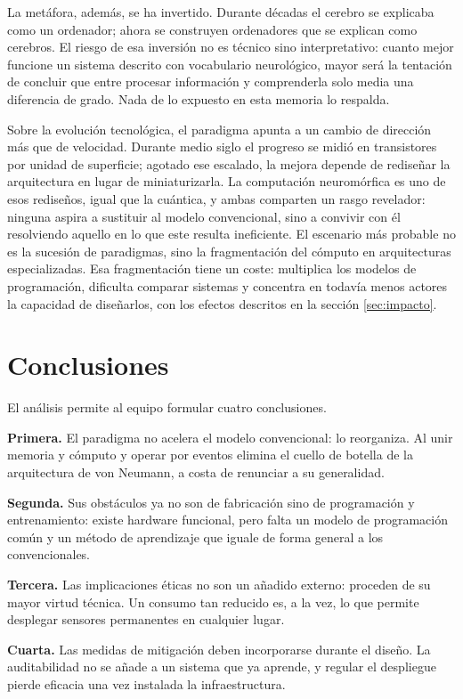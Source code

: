 \documentclass[a4paper,11pt,oneside]{book}
\begin{document}
La metáfora, además, se ha invertido. Durante décadas el cerebro se explicaba
como un ordenador; ahora se construyen ordenadores que se explican como
cerebros. El riesgo de esa inversión no es técnico sino interpretativo: cuanto
mejor funcione un sistema descrito con vocabulario neurológico, mayor será la
tentación de concluir que entre procesar información y comprenderla solo media
una diferencia de grado. Nada de lo expuesto en esta memoria lo respalda.

Sobre la evolución tecnológica, el paradigma apunta a un cambio de dirección más
que de velocidad. Durante medio siglo el progreso se midió en transistores por
unidad de superficie; agotado ese escalado, la mejora depende de rediseñar la
arquitectura en lugar de miniaturizarla. La computación neuromórfica es uno de
esos rediseños, igual que la cuántica, y ambas comparten un rasgo revelador:
ninguna aspira a sustituir al modelo convencional, sino a convivir con él
resolviendo aquello en lo que este resulta ineficiente. El escenario más
probable no es la sucesión de paradigmas, sino la fragmentación del cómputo en
arquitecturas especializadas. Esa fragmentación tiene un coste: multiplica los
modelos de programación, dificulta comparar sistemas y concentra en todavía
menos actores la capacidad de diseñarlos, con los efectos descritos en la
sección \ref{sec:impacto}.

\chapter{Conclusiones}
\label{cap:conclusiones}

El análisis permite al equipo formular cuatro conclusiones.

\textbf{Primera.} El paradigma no acelera el modelo convencional: lo reorganiza.
Al unir memoria y cómputo y operar por eventos elimina el cuello de botella de la
arquitectura de von Neumann, a costa de renunciar a su generalidad.

\textbf{Segunda.} Sus obstáculos ya no son de fabricación sino de programación y
entrenamiento: existe hardware funcional, pero falta un modelo de programación
común y un método de aprendizaje que iguale de forma general a los convencionales.

\textbf{Tercera.} Las implicaciones éticas no son un añadido externo: proceden de
su mayor virtud técnica. Un consumo tan reducido es, a la vez, lo que permite
desplegar sensores permanentes en cualquier lugar.

\textbf{Cuarta.} Las medidas de mitigación deben incorporarse durante el diseño.
La auditabilidad no se añade a un sistema que ya aprende, y regular el despliegue
pierde eficacia una vez instalada la infraestructura.
\end{document}
